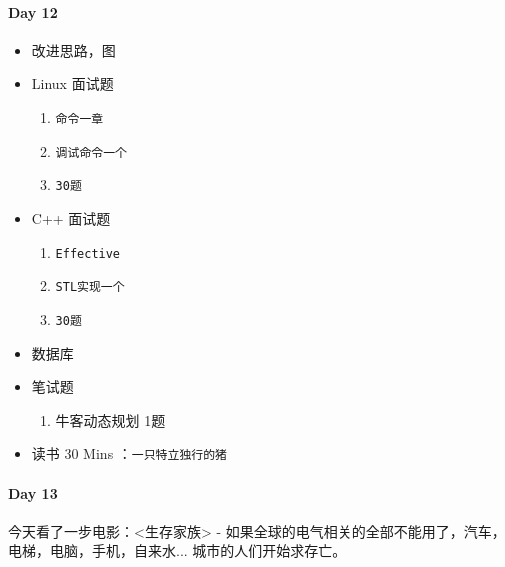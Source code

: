 \documentclass[UTF8,a4paper,8pt]{ctexart}
\begin{document}
 	 \paragraph{Day 12      \quad     }
	 	 \begin{itemize}[itemindent = 1em]
	 	 	\renewcommand\labelitemi{\makebox[0pt][l]{$\square$}\hspace{1em}} 
	 	 	\renewcommand\labelitemi{\makebox[0pt][l]{$\square$}\raisebox{.15ex}{\hspace{0.1em}$\checkmark$}}	
	 	 	\item   改进思路，图 	
	 	 	\item   Linux 面试题
	 	 	\begin{enumerate}
	 	 		\item \verb|命令一章|
	 	 		\item \verb|调试命令一个|
	 	 		\item \verb|30题|
	 	 	\end{enumerate}
	 	 	\item   C++   面试题
	 	 	\begin{enumerate}
	 	 		\item \verb|Effective|
	 	 		\item \verb|STL实现一个|
	 	 		\item \verb|30题|
	 	 	\end{enumerate}
	 	 	
	 	 	\item 数据库
	 	 	
	 	 	\item  笔试题
	 	 	\begin{enumerate}
	 	 		\item 牛客动态规划 1题
	 	 	\end{enumerate}
	 	 	
	 	 	\item   读书  30 Mins	：\verb|一只特立独行的猪|
	 	 	
	 	 	\renewcommand\labelitemi{\makebox[0pt][l]{$\square$}\hspace{1em}}
	 	 \end{itemize}
 	 \paragraph{Day 13      \quad     }
	 	 今天看了一步电影：<生存家族> - 如果全球的电气相关的全部不能用了，汽车，电梯，电脑，手机，自来水... 城市的人们开始求存亡。
	 	 
\end{document}
